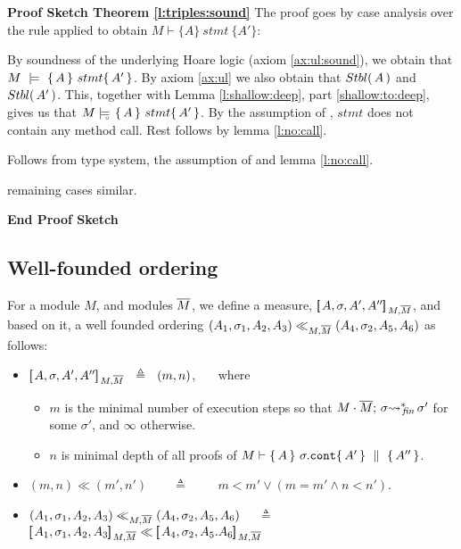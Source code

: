 \noindent
\vspace{.2cm}
 {\textbf{Proof Sketch Theorem \ref{l:triples:sound}} 
The proof goes by case analysis over the rule applied to obtain $M \vdash \{ A \}\ stmt \  \{ A' \} $:

\begin{description} 

\item[${\sc{extend}}$] 
By  soundness of the underlying Hoare logic (axiom \ref{ax:ul:sound}), we obtain that  $M\ \models\  \{\, A \, \}\ stmt \{\, A' \, \}$.
By axiom \ref{ax:ul} we also obtain that ${Stbl(\, A\, )}$ and  ${Stbl(\, A'\, )}$. 
This, together with   Lemma \ref{l:shallow:deep}, part \ref{shallow:to:deep}, gives us that
$M \models\!\!\!\!_{_{\circ}}\   \{\, A \, \}\ stmt \{\, A' \, \}  $. 
By the assumption of {}, $stmt$ does not contain any method call. Rest follows by lemma \ref{l:no:call}.

\item[${\sc{types-1}}$] 

Follows from type system, the assumption of {} and lemma \ref{l:no:call}.

\item{remaining cases} similar.

\end{description}
\noindent
\vspace{.1cm}
{\textbf{End Proof Sketch}} 


\subsection{Well-founded ordering}

 \begin{definition}
\label{def:measure}
For a module $M$, and modules $\overline{M}$,   we define a measure, $[\!\![\, A, \sigma,A',A'' ]\!\!]\,_{M,\overline{M}} $, and based on it, a well founded ordering $(A_1,\sigma_1,A_2, A_3) \ll_{M,\overline{M}}  (A_4,\sigma_2,A_5,A_6)$
as follows:
\begin{itemize}
\item
 $[\!\![\, A, \sigma,A',A'' ]\!\!]\,_{M,\overline{M}} \  \ \triangleq \ \  (m, n)$,  \ \ \  where
\begin{itemize}
\item
$m$ is the minimal number of execution steps so that $ M\cdot \overline{M};\, {\sigma} {\rightsquigarrow^*}\!\!_{\mathit{fin}}\, \sigma'$  for some $\sigma'$, {and $\infty$ otherwise}.
 \item
  $n$ is minimal depth of all proofs of $M \vdash  \{\, A \, \}\ \sigma.\mbox{\normalfont{\texttt{cont}}} \{\, A' \, \} \, \,\parallel\,\, \{\, A'' \, \}  $.
\end{itemize}
 \item
 $(m,n) \ll (m',n')$\ \  \ \ $\triangleq$ \ \  \ \ $ m<m'\vee  (m=m'  \wedge n < n')   $.
\item
$(A_1,\sigma_1,A_2, A_3) \ll_{M,\overline{M}}  (A_4,\sigma_2,A_5, A_6)$  \  \  $\triangleq$ \ \ 
$\measure {A_1, \sigma_1,A_2, A_3} {M,\Mtwo}  \ll \measure {A_4, \sigma_2,A_5. A_6} {M,\Mtwo} $
\end{itemize}
\end{definition}

}
